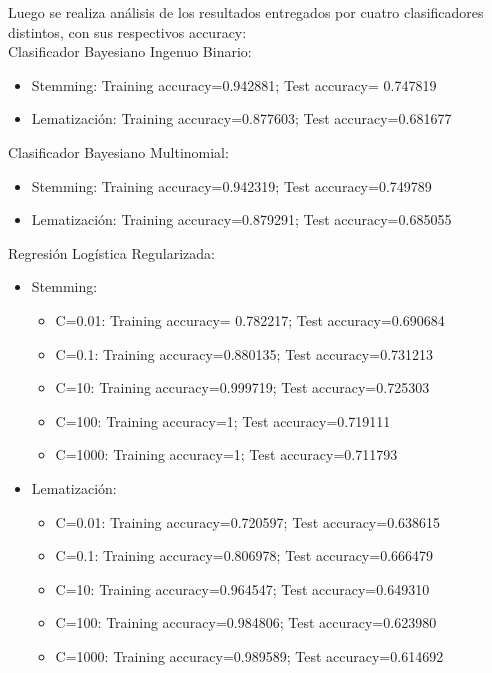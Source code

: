 \documentclass[letter, 10pt]{article}
\begin{document}
Luego se realiza análisis de los resultados entregados por cuatro clasificadores distintos, con sus respectivos accuracy:\\
Clasificador Bayesiano Ingenuo Binario:
\begin{itemize}
  \item Stemming: Training accuracy=0.942881; Test accuracy= 0.747819
  \item Lematización: Training accuracy=0.877603; Test accuracy=0.681677
\end{itemize}


Clasificador Bayesiano Multinomial:
\begin{itemize}
  \item Stemming: Training accuracy=0.942319; Test accuracy=0.749789
  \item Lematización: Training accuracy=0.879291; Test accuracy=0.685055
\end{itemize}


Regresión Logística Regularizada:
\begin{itemize}
  \item Stemming: 
  \begin{itemize}
    \item C=0.01: Training accuracy= 0.782217; Test accuracy=0.690684
    \item C=0.1: Training accuracy=0.880135; Test accuracy=0.731213
    \item C=10: Training accuracy=0.999719; Test accuracy=0.725303
    \item C=100: Training accuracy=1; Test accuracy=0.719111
    \item C=1000: Training accuracy=1; Test accuracy=0.711793
  \end{itemize}
  \item Lematización: 
    \begin{itemize}
    \item C=0.01: Training accuracy=0.720597; Test accuracy=0.638615
    \item C=0.1: Training accuracy=0.806978; Test accuracy=0.666479
    \item C=10: Training accuracy=0.964547; Test accuracy=0.649310
    \item C=100: Training accuracy=0.984806; Test accuracy=0.623980
    \item C=1000: Training accuracy=0.989589; Test accuracy=0.614692
  \end{itemize}
\end{itemize}
\end{document}
